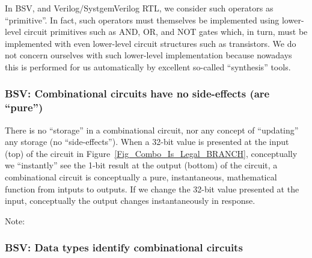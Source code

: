 In BSV, and Verilog/SystgemVerilog RTL, we consider such operators as
``primitive''.  In fact, such operators must themselves be implemented
using lower-level circuit primitives such as AND, OR, and NOT gates
which, in turn, must be implemented with even lower-level circuit
structures such as transistors.  We do not concern ourselves with such
lower-level implementation because nowadays this is performed for us
automatically by excellent so-called ``synthesis'' tools.


\subsubsection{BSV: Combinational circuits have no side-effects (are ``pure'')}


There is no ``storage'' in a combinational circuit, nor any concept of
``updating'' any storage (no ``side-effects'').  When a 32-bit value
is presented at the input (top) of the circuit in
Figure~\ref{Fig_Combo_Is_Legal_BRANCH}, conceptually we
``instantly'' see the 1-bit result at the output (bottom) of the
circuit, {\ie} a combinational circuit is conceptually a pure,
instantaneous, mathematical function from intputs to outputs.  If we
change the 32-bit value presented at the input, conceptually the
output changes instantaneously in response.


Note: 



\subsubsection{BSV: Data types identify combinational circuits}

